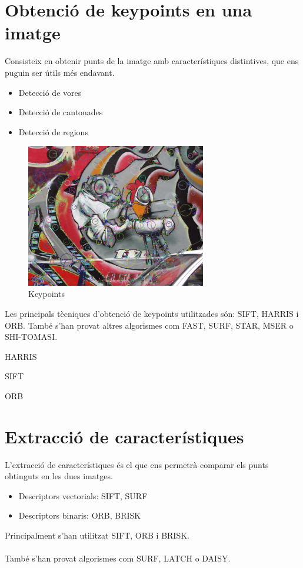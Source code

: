 \section{Obtenció de keypoints en una imatge}
	Consisteix en obtenir punts de la imatge amb característiques distintives, que ens puguin ser útils més endavant.
	\begin{itemize}	
		\item{Detecció de vores}
		\item{Detecció de cantonades}
		\item{Detecció de regions}
	\end{itemize}
	\begin{figure}[H]
		\centering
		\includegraphics[width=0.7\textwidth]{images/RobotKp}
		\caption{Keypoints}
	\end{figure}
	Les principals tècniques d'obtenció de keypoints utilitzades són: SIFT, HARRIS i ORB.
	També s'han provat altres algorismes com FAST, SURF, STAR, MSER o SHI-TOMASI.

	HARRIS

	SIFT

	ORB

\section{Extracció de característiques}

	L'extracció de característiques és el que ens permetrà comparar els punts obtinguts en les dues imatges.
	\begin{itemize}
		\item{Descriptors vectorials: SIFT, SURF}
		\item{Descriptors binaris: ORB, BRISK}
	\end{itemize}
	Principalment s'han utilitzat SIFT, ORB i BRISK.\\\\
	També s'han provat algorismes com SURF, LATCH o DAISY.

